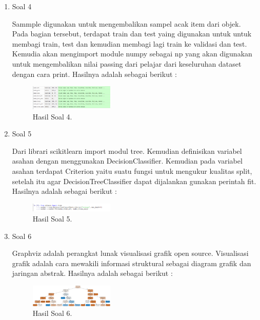 \begin{enumerate}
	\item Soal 4
	\hfill\break
	
	Sammple digunakan untuk mengembalikan sampel acak item dari objek. Pada bagian tersebut, terdapat train dan test yaing digunakan untuk untuk membagi train, test dan kemudian membagi lagi train ke validasi dan test. Kemudia akan mengimport module numpy sebagai np yang akan digunakan untuk mengembalikan nilai passing dari pelajar dari keseluruhan dataset dengan cara print. Hasilnya adalah sebagai berikut :
	\begin{figure}[H]
	\centering
		\includegraphics[width=4cm]{figures/1174015/tugas2/materi/hasil4.PNG}
		\caption{Hasil Soal 4.}
	\end{figure}

	\item Soal 5
	\hfill\break
	
	Dari librari scikitlearn import modul tree. Kemudian definisikan variabel asahan dengan menggunakan DecisionClassifier. Kemudian pada variabel asahan terdapat Criterion yaitu suatu fungsi untuk mengukur kualitas split, setelah itu agar DecisionTreeClassifier dapat dijalankan gunakan perintah fit. Hasilnya adalah sebagai berikut :
	\begin{figure}[H]
	\centering
		\includegraphics[width=4cm]{figures/1174015/tugas2/materi/hasil5.PNG}
		\caption{Hasil Soal 5.}
	\end{figure}

	\item Soal 6
	\hfill\break
	
	Graphviz adalah perangkat lunak visualisasi grafik open source. Visualisasi grafik adalah cara mewakili informasi struktural sebagai diagram grafik dan jaringan abstrak. Hasilnya adalah sebagai berikut :
	\begin{figure}[H]
	\centering
		\includegraphics[width=4cm]{figures/1174015/tugas2/materi/hasil6.PNG}
		\caption{Hasil Soal 6.}
	\end{figure}


\end{enumerate}
